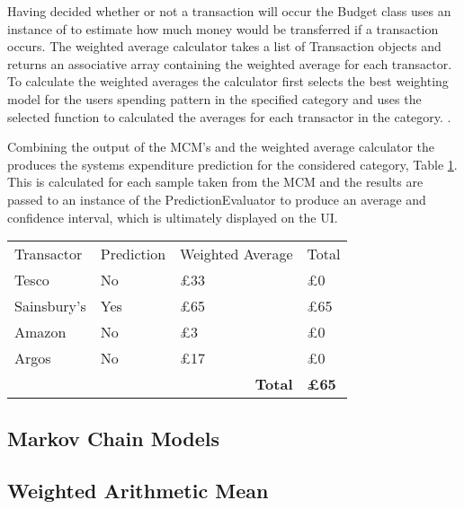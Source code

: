 Having decided whether or not a transaction will occur the Budget class uses an instance of  to estimate how much money would be transferred if a transaction occurs. The weighted average calculator takes a list of Transaction objects and returns an associative array containing the weighted average for each transactor. To calculate the weighted averages the calculator first selects the best weighting model for the users spending pattern in the specified category and uses the selected function to calculated the averages for each transactor in the category. .

Combining the output of the MCM's and the weighted average calculator the produces the systems expenditure prediction for the considered category, Table \ref{fig:predictions-combined}. This is calculated for each sample taken from the MCM and the results are passed to an instance of the PredictionEvaluator to produce an average and confidence interval, which is ultimately displayed on the UI.

\begin{table}[h]
\begin{tabular}{llll}
Transactor  & Prediction & Weighted Average                   & Total        \\
Tesco       & No         & £33                                & £0           \\
Sainsbury's & Yes        & £65                                & £65          \\
Amazon      & No         & £3                                 & £0           \\
Argos       & No         & £17                                & £0           \\
            &            & \multicolumn{1}{r}{\textbf{Total}} & \textbf{£65}
\end{tabular}

\label{fig:predictions-combined}
\end{table}

\subsection{Markov Chain Models}

\subsection{Weighted Arithmetic Mean}
\label{section:suggestion-implementation}

